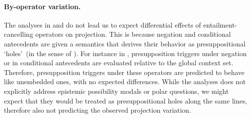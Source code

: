 \documentclass[a4paper,12pt,twoside]{article}
\begin{document}


	\paragraph{By-operator variation.} 
		The analyses in \citealt{heim_projection_1983,heim_presupposition_1992} and \citealt{van_der_sandt_presupposition_1992} do not lead us to expect differential effects of entailment-cancelling operators on projection. This is because negation and conditional antecedents are given a semantics that derives their behavior as presuppositional \lq holes\rq\ (in the sense of \citealt{karttunen_observations_1971}). For instance in \citealt{heim_projection_1983}, presupposition triggers under negation or in conditional antecedents are evaluated relative to the global context set. Therefore, presupposition triggers under these operators are predicted to behave like unembedded ones, with no expected differences. While the analyses does not explicitly address epistemic possibility modals or polar questions, we might expect that they would be treated as presuppositional holes along the same lines, therefore also not predicting the observed projection variation.
		
\end{document}
